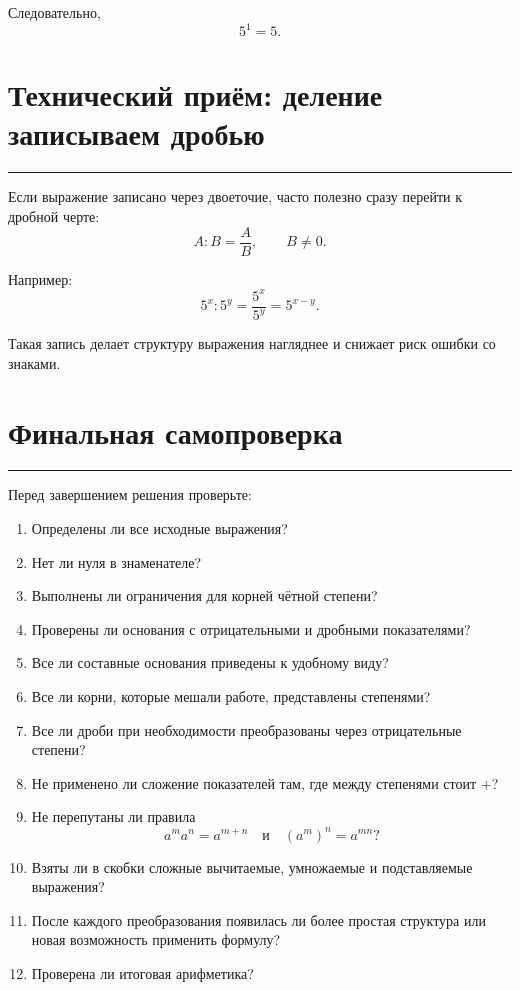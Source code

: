 \documentclass[a4paper,12pt]{article}
\newcommand{\lessonrule}{%
  \par\vspace{0.3em}
  {\color{accent}\rule{\linewidth}{0.6pt}}
  \vspace{0.5em}
}
\begin{document}
Следовательно,
\[
5^1=\boxed{5}.
\]

\section*{\color{darkaccent}Технический приём: деление записываем дробью}
\lessonrule

Если выражение записано через двоеточие,
часто полезно сразу перейти к дробной черте:
\[
A:B=\frac AB,
\qquad B\ne0.
\]

Например:
\[
5^x:5^y
=
\frac{5^x}{5^y}
=
5^{x-y}.
\]

Такая запись делает структуру выражения нагляднее
и снижает риск ошибки со знаками.

\section*{\color{darkaccent}Финальная самопроверка}
\lessonrule

Перед завершением решения проверьте:

\begin{enumerate}
  \item Определены ли все исходные выражения?
  \item Нет ли нуля в знаменателе?
  \item Выполнены ли ограничения для корней чётной степени?
  \item Проверены ли основания с отрицательными и дробными показателями?
  \item Все ли составные основания приведены к удобному виду?
  \item Все ли корни, которые мешали работе, представлены степенями?
  \item Все ли дроби при необходимости преобразованы через отрицательные степени?
  \item Не применено ли сложение показателей там, где между степенями стоит \(+\)?
  \item Не перепутаны ли правила
  \[
  a^m a^n=a^{m+n}
  \quad\text{и}\quad
  (a^m)^n=a^{mn}?
  \]
  \item Взяты ли в скобки сложные вычитаемые, умножаемые и подставляемые выражения?
  \item После каждого преобразования появилась ли более простая структура
  или новая возможность применить формулу?
  \item Проверена ли итоговая арифметика?
\end{enumerate}
\end{document}
